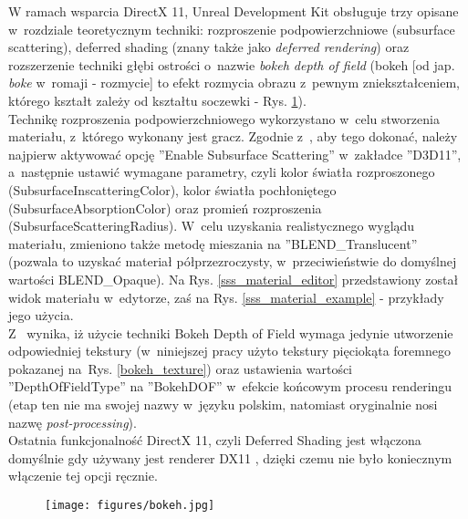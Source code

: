 W ramach wsparcia DirectX 11, Unreal Development Kit obsługuje trzy opisane w~rozdziale teoretycznym techniki: rozproszenie podpowierzchniowe (subsurface scattering), deferred shading (znany także jako \emph{deferred rendering}) oraz rozszerzenie techniki głębi ostrości o~nazwie \emph{bokeh depth of field} (bokeh [od jap. \emph{boke} w~romaji - rozmycie] to efekt rozmycia obrazu z~pewnym zniekształceniem, którego kształt zależy od kształtu soczewki - Rys. \ref{bokeh_example}).\\

Technikę rozproszenia podpowierzchniowego wykorzystano w~celu stworzenia materiału, z~którego wykonany jest gracz. Zgodnie z~\cite{udk_sss}, aby tego dokonać, należy najpierw aktywować opcję ''Enable Subsurface Scattering'' w~zakładce ''D3D11'', a~następnie ustawić wymagane parametry, czyli kolor światła rozproszonego (SubsurfaceInscatteringColor), kolor światła pochłoniętego (SubsurfaceAbsorptionColor) oraz promień rozproszenia (SubsurfaceScatteringRadius). W~celu uzyskania realistycznego wyglądu materiału, zmieniono także metodę mieszania na ''BLEND\_Translucent'' (pozwala to uzyskać materiał półprzezroczysty, w~przeciwieństwie do domyślnej wartości BLEND\_Opaque). Na Rys. \ref{sss_material_editor} przedstawiony został widok materiału w~edytorze, zaś na Rys. \ref{sss_material_example} - przykłady jego użycia.\\

Z~\cite{udk_bokeh_dof} wynika, iż użycie techniki Bokeh Depth of Field wymaga jedynie utworzenie odpowiedniej tekstury (w~niniejszej pracy użyto tekstury pięciokąta foremnego pokazanej na~Rys. \ref{bokeh_texture}) oraz ustawienia wartości ''DepthOfFieldType'' na ''BokehDOF'' w~efekcie końcowym procesu renderingu (etap ten nie ma swojej nazwy w~języku polskim, natomiast oryginalnie nosi nazwę \emph{post-processing}).\\

Ostatnia funkcjonalność DirectX 11, czyli Deferred Shading jest włączona domyślnie gdy używany jest renderer DX11 \cite{udk_deferred_shading}, dzięki czemu nie było koniecznym włączenie tej opcji ręcznie.

\begin{figure}
\begin{center}
\texttt{[image: figures/bokeh.jpg]}
\label{bokeh_example}
\end{center}
\end{figure}

